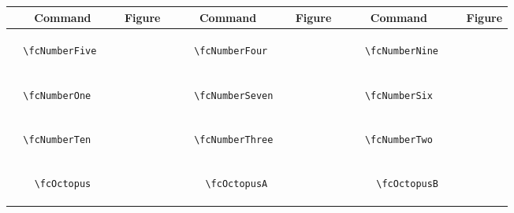 \documentclass[x11names]{article}
\begin{document}
\begin{table}[H]\centering\begin{tabular}{|c|c|c|c|c|c|}\hline{\bf Command} & {\bf Figure} & {\bf Command} & {\bf Figure} & {\bf Command} & {\bf Figure}\\	\hline	&\multirow{5}{*}{	\fcNumberFive	[scale=0.4]} & &\multirow{5}{*}{	\fcNumberFour	[scale=0.4]} & &\multirow{5}{*}{	\fcNumberNine	[scale=0.4]}\\	& & & & & \\	& & & & & \\	\verb|	\fcNumberFive	| & & \verb|	\fcNumberFour	| & & \verb|	\fcNumberNine	| & \\	& & & & & \\	& & & & & \\	& & & & & \\	\hline									
		&\multirow{5}{*}{	\fcNumberOne	[scale=0.4]} & &\multirow{5}{*}{	\fcNumberSeven	[scale=0.4]} & &\multirow{5}{*}{	\fcNumberSix	[scale=0.4]}\\	& & & & & \\	& & & & & \\	\verb|	\fcNumberOne	| & & \verb|	\fcNumberSeven	| & & \verb|	\fcNumberSix	| & \\	& & & & & \\	& & & & & \\	& & & & & \\	\hline									
		&\multirow{5}{*}{	\fcNumberTen	[scale=0.4]} & &\multirow{5}{*}{	\fcNumberThree	[scale=0.4]} & &\multirow{5}{*}{	\fcNumberTwo	[scale=0.4]}\\	& & & & & \\	& & & & & \\	\verb|	\fcNumberTen	| & & \verb|	\fcNumberThree	| & & \verb|	\fcNumberTwo	| & \\	& & & & & \\	& & & & & \\	& & & & & \\	\hline									
		&\multirow{5}{*}{	\fcOctopus	[scale=0.8]} & &\multirow{5}{*}{	\fcOctopusA	[scale=0.3]} & &\multirow{5}{*}{	\fcOctopusB	[scale=0.3]}\\	& & & & & \\	& & & & & \\	\verb|	\fcOctopus	| & & \verb|	\fcOctopusA	| & & \verb|	\fcOctopusB	| & \\	& & & & & \\	& & & & & \\	& & & & & \\	\hline									

\end{tabular}
\end{table}
\end{document}
